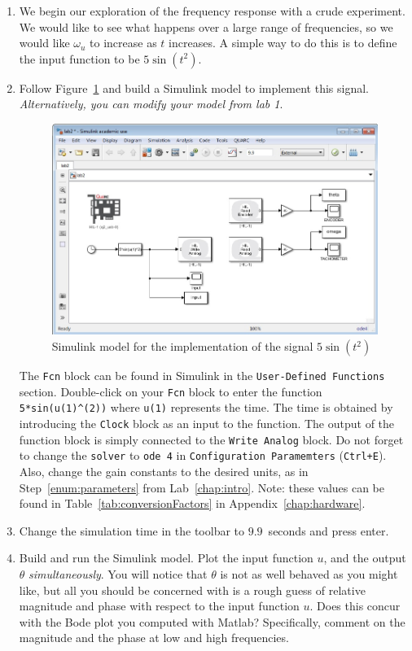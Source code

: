 \begin{enumerate}
    \item We begin our exploration of the frequency response with a crude
          experiment.  We would like to see what happens over a large range of
          frequencies, so we would like \(\omega_u\) to increase as \(t\) increases.  A
          simple way to do this is to define the input function to be \(5\sin(t^{2})\).
    \item Follow Figure~\ref{fig:model4} and build a \textsf{Simulink} model to
          implement this signal. \emph{Alternatively, you can modify your model from lab 1}.
          \begin{figure}[htbp]
              \centering
              \includegraphics[width=0.6\hsize]{pix/lab2.jpg}
              \caption{\textsf{Simulink} model for the implementation of the signal \(5\sin(t^{2})\)}\label{fig:model4}
          \end{figure}%
          The \verb|Fcn| block can be found in \textsf{Simulink} in the
          \verb|User-Defined Functions| section.  Double-click on your \verb|Fcn| block
          to enter the function \verb|5*sin(u(1)^(2))| where \verb|u(1)| represents the
          time.  The time is obtained by introducing the \verb|Clock| block as an input
          to the function.  The output of the function block is simply connected to the
          \verb|Write Analog| block.  Do not forget to change the \verb|solver| to
          \verb|ode 4| in \verb|Configuration Paramemters| (\verb|Ctrl+E|). Also,
          change the gain constants to the desired units, as in
          Step~\ref{enum:parameters} from Lab~\ref{chap:intro}\@. Note: these values can be found in
          Table~\ref{tab:conversionFactors} in Appendix~\ref{chap:hardware}.
    \item Change the simulation time in the toolbar to \(9.9\)~seconds and press enter.
    \item \label{enum:simulatet2} Build and run the \textsf{Simulink} model. %
          Plot the input function \(u\), and the output \(\theta \) \emph{simultaneously}.
          You will notice that \(\theta \) is not as well behaved as you might like, but
          all you should be concerned with is a rough guess of relative magnitude and
          phase with respect to the input function \(u\).  Does this concur with the
          Bode plot you computed with \textsf{Matlab}?  Specifically, comment on the
          magnitude and the phase at low and high frequencies.


\end{enumerate}
